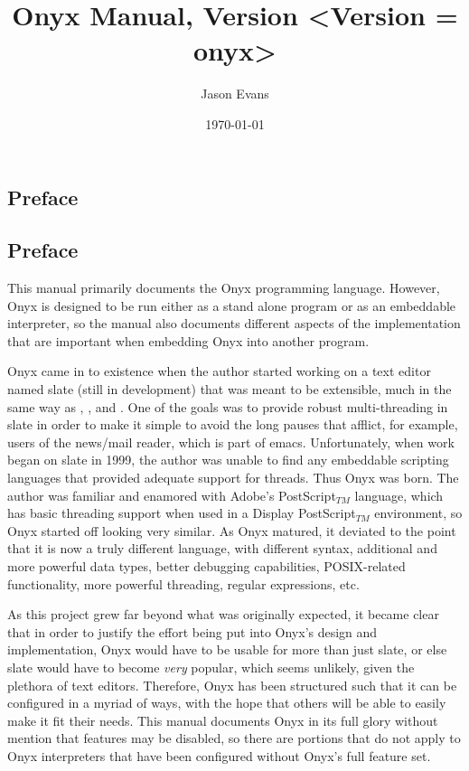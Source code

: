 \documentclass[10pt,titlepage]{book}
\title{Onyx Manual, Version <Version = onyx>}
\author{Jason Evans}
\date{\today}
\newcommand{\clearemptydoublepage}
	{\newpage \thispagestyle{empty} \cleardoublepage}
\begin{document}
\frontmatter
\pagestyle{plain}
\maketitle

\clearemptydoublepage
\begin{htmlonly}
\part*{Preface}
\end{htmlonly}
\begin{latexonly}
\chapter*{Preface}
\end{latexonly}

This manual primarily documents the Onyx programming language.  However, Onyx is
designed to be run either as a stand alone program or as an embeddable
interpreter, so the manual also documents different aspects of the
implementation that are important when embedding Onyx into another program.

Onyx came in to existence when the author started working on a text editor named
slate (still in development) that was meant to be extensible, much in the same
way as ,
, and
.  One of
the goals was to provide robust multi-threading in slate in order to make it
simple to avoid the long pauses that afflict, for example, users of the
 news/mail reader, which is part
of emacs.  Unfortunately, when work began on slate in 1999, the author was
unable to find any embeddable scripting languages that provided adequate support
for threads.  Thus Onyx was born.  The author was familiar and enamored with
Adobe's PostScript$_{TM}$ language, which has basic threading support when used
in a Display PostScript$_{TM}$ environment, so Onyx started off looking very
similar.  As Onyx matured, it deviated to the point that it is now a truly
different language, with different syntax, additional and more powerful data
types, better debugging capabilities, POSIX-related functionality, more powerful
threading, regular expressions, etc.

As this project grew far beyond what was originally expected, it became clear
that in order to justify the effort being put into Onyx's design and
implementation, Onyx would have to be usable for more than just slate, or else
slate would have to become {\em very} popular, which seems unlikely, given the
plethora of text editors.  Therefore, Onyx has been structured such that it can
be configured in a myriad of ways, with the hope that others will be able to
easily make it fit their needs.  This manual documents Onyx in its full glory
without mention that features may be disabled, so there are portions that do not
apply to Onyx interpreters that have been configured without Onyx's full feature
set.
\end{document}
